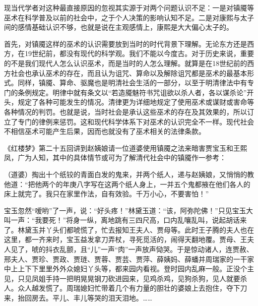 
现当代学者对这种最直接原因的忽视其实源于对两个问题认识不足：一是对镇魇等巫术在科学普及以前的社会中，之于个人决策的影响认知不足。二是对康熙与太子间的感情基础认识不够，也就是说在主观感情上，康熙是大大偏心太子的。



首先，对镇魇这样的巫术的认识需要放到当时的时代背景下理解。无论东方还是西方，在19世纪前，都没有现代的科学观。我们不能以今度古。对于历史来说，重要的不是我们现代人怎么认识巫术，而是当时的人怎么理解。就算是在18世纪前的西方社会也承认巫术的存在，而且认为诅咒、算命以及解除诅咒都是巫术的最基本形式。同样，镇魇、算命、驱魔也是明清社会生活的一部分，以至于明清律法中有专门的条例规定。明律中就有条文以“若造魇魅符书咒诅欲以杀人者，各以谋杀论”开头，规定了各种可能发生的情况。清律更为详细地规定了使用巫术或谋财或害命等各种情况的判罚。也就是说，当时社会是承认这些巫术的存在及其效果的，所以订立了专门的律例来惩罚。这和现代科学体系下对巫术的认识完全不一样。现代社会不相信巫术可能产生后果，因而也就没有了巫术相关的法律条款。



《红楼梦》第二十五回讲到赵姨娘请一位道婆使用镇魇之法来暗害贾宝玉和王熙凤，广为人知，其中的具体情节或可为了解清代社会中的镇魇作一参考：



\begin{bookquote}（道婆）掏出十个纸铰的青面白发的鬼来，并两个纸人，递与赵姨娘，又悄悄的教他道：“把他两个的年庚八字写在这两个纸人身上，一并五个鬼都掖在他们各人的床上就完了。我只在家里作法，自有效验。千万小心，不要害怕！”\end{bookquote}


\begin{bookquote}宝玉忽然“嗳哟”了一声，说：“好头疼！”林黛玉道：“该，阿弥陀佛！”只见宝玉大叫一声：“我要死！”将身一纵，离地跳有三四尺高，口内乱嚷乱叫，说起胡话来了。林黛玉并丫头们都唬慌了，忙去报知王夫人、贾母等。此时王子腾的夫人也在这里，都一齐来时，宝玉益发拿刀弄杖，寻死觅活的，闹得天翻地覆。贾母、王夫人见了，唬的抖衣乱颤，且“儿”一声“肉”一声放声恸哭。于是惊动诸人，连贾赦、邢夫人、贾珍、贾政、贾琏、贾蓉、贾芸、贾萍、薛姨妈、薛蟠并周瑞家的一干家中上上下下里里外外众媳妇丫头等，都来园内看视。登时园内乱麻一般。正没个主见，只见凤姐手持一把明晃晃钢刀砍进园来，见鸡杀鸡，见狗杀狗，见人就要杀人。众人越发慌了。周瑞媳妇忙带着几个有力量的胆壮的婆娘上去抱住，夺下刀来，抬回房去。平儿、丰儿等哭的泪天泪地。……\end{bookquote}

